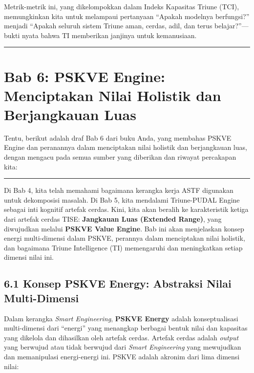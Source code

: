 \documentclass[
  letterpaper,
  DIV=11,
  numbers=noendperiod]{scrreprt}
\begin{document}
Metrik-metrik ini, yang dikelompokkan dalam Indeks Kapasitas Triune
(TCI), memungkinkan kita untuk melampaui pertanyaan ``Apakah modelnya
berfungsi?'' menjadi ``Apakah seluruh sistem Triune aman, cerdas, adil,
dan terus belajar?''---bukti nyata bahwa TI memberikan janjinya untuk
kemanusiaan.

\begin{center}\rule{0.5\linewidth}{0.5pt}\end{center}


\chapter{\texorpdfstring{\textbf{Bab 6: PSKVE Engine: Menciptakan Nilai
Holistik dan Berjangkauan
Luas}}{Bab 6: PSKVE Engine: Menciptakan Nilai Holistik dan Berjangkauan Luas}}\label{bab-6-pskve-engine-menciptakan-nilai-holistik-dan-berjangkauan-luas}

Tentu, berikut adalah draf Bab 6 dari buku Anda, yang membahas PSKVE
Engine dan peranannya dalam menciptakan nilai holistik dan berjangkauan
luas, dengan mengacu pada semua sumber yang diberikan dan riwayat
percakapan kita:

\begin{center}\rule{0.5\linewidth}{0.5pt}\end{center}

Di Bab 4, kita telah memahami bagaimana kerangka kerja ASTF digunakan
untuk dekomposisi masalah. Di Bab 5, kita mendalami Triune-PUDAL Engine
sebagai inti kognitif artefak cerdas. Kini, kita akan beralih ke
karakteristik ketiga dari artefak cerdas TISE: \textbf{Jangkauan Luas
(Extended Range)}, yang diwujudkan melalui \textbf{PSKVE Value Engine}.
Bab ini akan menjelaskan konsep energi multi-dimensi dalam PSKVE,
perannya dalam menciptakan nilai holistik, dan bagaimana Triune
Intelligence (TI) memengaruhi dan meningkatkan setiap dimensi nilai ini.

\section{\texorpdfstring{\textbf{6.1 Konsep PSKVE Energy: Abstraksi
Nilai
Multi-Dimensi}}{6.1 Konsep PSKVE Energy: Abstraksi Nilai Multi-Dimensi}}\label{konsep-pskve-energy-abstraksi-nilai-multi-dimensi}

Dalam kerangka \emph{Smart Engineering}, \textbf{PSKVE Energy} adalah
konseptualisasi multi-dimensi dari ``energi'' yang menangkap berbagai
bentuk nilai dan kapasitas yang dikelola dan dihasilkan oleh artefak
cerdas. Artefak cerdas adalah \emph{output} yang berwujud atau tidak
berwujud dari \emph{Smart Engineering} yang mewujudkan dan memanipulasi
energi-energi ini. PSKVE adalah akronim dari lima dimensi nilai:
\end{document}
